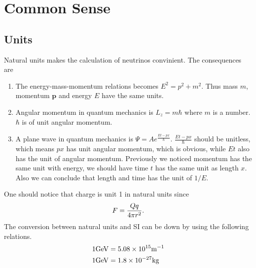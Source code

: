 \documentclass[letterpaper,12pt,english]{sphinxmanual}
\begin{document}
\chapter{Common Sense}
\label{commonsense:common-sense}\label{commonsense::doc}

\section{Units}
\label{commonsense:units}
Natural units makes the calculation of neutrinos convinient. The consequences are
\begin{enumerate}
\item {} 
The energy-mass-momentum relations becomes \(E^2 = p^2 + m^2\). Thus mass \(m\), momentum \(\mathbf p\) and energy \(E\) have the same units.

\item {} 
Angular momentum in quantum mechanics is \(L_z = m\hbar\) where \(m\) is a number. \(\hbar\) is of unit angular momentum.

\item {} 
A plane wave in quantum mechanics is \(\Psi = A e^{ \frac{E t - p x}{\hbar} }\). \(\frac{E t - p x}{\hbar}\) should be unitless, which means \(px\) has unit angular momentum, which is obvious, while \(E t\) also has the unit of angular momentum. Previously we noticed momentum has the same unit with energy, we should have time  \(t\) has the same unit as length \(x\). Also we can conclude that length and time has the unit of \(1/E\).

\end{enumerate}

One should notice that charge is unit 1 in natural units since
\begin{gather}
\begin{split}F = \frac{Qq}{4\pi r^2}.\end{split}\notag
\end{gather}
The conversion between natural units and SI can be down by using the following relations.
\begin{gather}
\begin{split}1 \mathrm{GeV} &= 5.08 \times 10^{15} \mathrm {m^{-1}} \\
1 \mathrm{GeV} &= 1.8\times 10^{-27} \mathrm{kg}\end{split}\notag
\end{gather}
\end{document}
